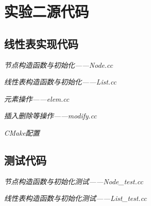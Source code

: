 \documentclass[format=draft,language=chinese,category=academic-report]{hustreport}
\begin{document}
\section{实验二源代码}\label{appendix:lab2}
\subsection{线性表实现代码}
\emph{节点构造函数与初始化——Node.cc}

\emph{线性表构造函数与初始化——List.cc}

\emph{元素操作——elem.cc}

\emph{插入删除等操作——modify.cc}

\emph{CMake配置}

\subsection{测试代码}\label{appendix:test2}
\emph{节点构造函数与初始化测试——Node\_test.cc}

\emph{线性表构造函数与初始化测试——List\_test.cc}

\end{document}
